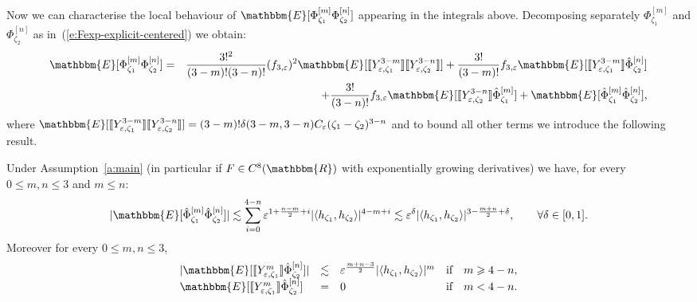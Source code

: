 Now we can characterise the local behaviour of $\mathbbm{E}
[\Phi^{[m]}_{\zeta_1} \Phi^{[n]}_{\zeta_2}]$ appearing in the integrals above.
Decomposing separately $\Phi^{[m]}_{\zeta_1}$ and $\Phi^{[n]}_{\zeta_2}$ as
in~(\ref{e:Fexp-explicit-centered}) we obtain:
\begin{eqnarray*}
  \mathbbm{E} [\Phi^{[m]}_{\zeta_1} \Phi^{[n]}_{\zeta_2}] & = & \frac{3!^2}{(3
  - m) ! (3 - n) !} (f_{3, \varepsilon})^2 \mathbbm{E} [\llbracket Y^{3 -
  m}_{\varepsilon, \zeta_1} \rrbracket \llbracket Y^{3 - n}_{\varepsilon,
  \zeta_2} \rrbracket] + \frac{3!}{(3 - m) !} f_{3, \varepsilon} \mathbbm{E}
  [\llbracket Y^{3 - m}_{\varepsilon, \zeta_1} \rrbracket
  \hat{\Phi}_{\zeta_2}^{[n]}]\\
  &  & + \frac{3!}{(3 - n) !} f_{3, \varepsilon} \mathbbm{E} [\llbracket Y^{3
  - n}_{\varepsilon, \zeta_2} \rrbracket \hat{\Phi}_{\zeta_1}^{[m]}]
  +\mathbbm{E} [\hat{\Phi}_{\zeta_1}^{[m]} \hat{\Phi}_{\zeta_2}^{[n]}],
\end{eqnarray*}
where $\mathbbm{E} [\llbracket Y^{3 - m}_{\varepsilon, \zeta_1} \rrbracket
\llbracket Y^{3 - n}_{\varepsilon, \zeta_2} \rrbracket] = (3 - m) ! \delta (3
- m, 3 - n) C_{\varepsilon} (\zeta_1 - \zeta_2)^{3 - n}$ and to bound all
other terms we introduce the following result.

\begin{lemma}
  \label{l:bound-corr}Under Assumption~\ref{a:main} (in particular if $F \in
  C^8 (\mathbbm{R})$ with exponentially growing derivatives) we have, for
  every $0 \leqslant m, n \leqslant 3$ and $m \leqslant n$:
  \[ | \mathbbm{E} [\hat{\Phi}^{[m]}_{\zeta_1} \hat{\Phi}^{[n]}_{\zeta_2}] |
     \lesssim \sum_{i = 0}^{4 - n} \varepsilon^{1 + \frac{n - m}{2} + i} |
     \langle h_{\zeta_1}, h_{\zeta_2} \rangle |^{4 - m + i} \lesssim
     \varepsilon^{\delta} | \langle h_{\zeta_1}, h_{\zeta_2} \rangle |^{3 -
     \frac{m + n}{2} + \delta}, \qquad \forall \delta \in [0, 1] . \]
  Moreover for every $0 \leqslant m, n \leqslant 3$,
  \[ \begin{array}{lllll}
       | \mathbbm{E} [\llbracket Y^m_{\varepsilon, \zeta_1} \rrbracket
       \hat{\Phi}^{[n]}_{\zeta_2}] | & \lesssim & \varepsilon^{\frac{m + n -
       3}{2}} | \langle h_{\zeta_1}, h_{\zeta_2} \rangle |^m & \text{if} & m
       \geqslant 4 - n,\\
       \mathbbm{E} [\llbracket Y^m_{\varepsilon, \zeta_1} \rrbracket
       \hat{\Phi}^{[n]}_{\zeta_2}] & = & 0 & \text{if} & m < 4 - n.
     \end{array} \]
\end{lemma}

